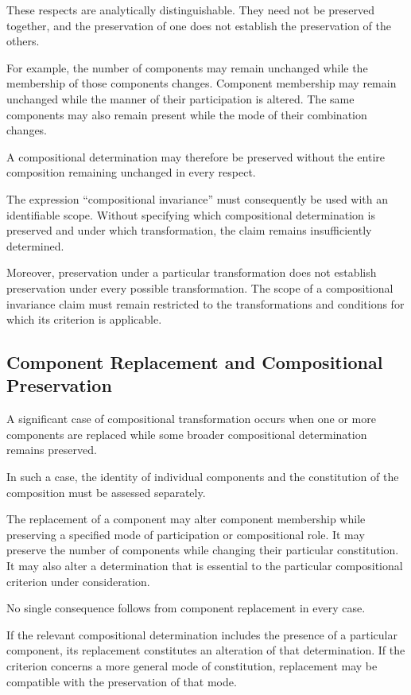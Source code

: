 These respects are analytically distinguishable.
They need not be preserved together, and the preservation
of one does not establish the preservation of the others.

For example, the number of components may remain unchanged
while the membership of those components changes. Component
membership may remain unchanged while the manner of their
participation is altered. The same components may also
remain present while the mode of their combination changes.

A compositional determination may therefore be preserved
without the entire composition remaining unchanged in
every respect.

The expression ``compositional invariance'' must consequently
be used with an identifiable scope. Without specifying
which compositional determination is preserved and under
which transformation, the claim remains insufficiently
determined.

Moreover, preservation under a particular transformation
does not establish preservation under every possible
transformation. The scope of a compositional invariance
claim must remain restricted to the transformations and
conditions for which its criterion is applicable.

\subsection{Component Replacement and Compositional Preservation}

A significant case of compositional transformation occurs
when one or more components are replaced while some broader
compositional determination remains preserved.

In such a case, the identity of individual components
and the constitution of the composition must be assessed
separately.

The replacement of a component may alter component membership
while preserving a specified mode of participation or
compositional role. It may preserve the number of components
while changing their particular constitution. It may also
alter a determination that is essential to the particular
compositional criterion under consideration.

No single consequence follows from component replacement
in every case.

If the relevant compositional determination includes the
presence of a particular component, its replacement
constitutes an alteration of that determination. If the
criterion concerns a more general mode of constitution,
replacement may be compatible with the preservation of
that mode.

